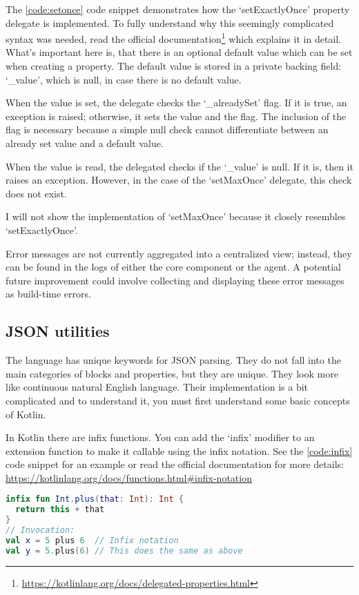 The \ref{code:setonce} code snippet demonstrates how the `setExactlyOnce' property delegate is implemented. To fully understand why this seemingly complicated syntax was needed, read the official documentation\footnote{\url{https://kotlinlang.org/docs/delegated-properties.html}} which explains it in detail. What's important here is, that there is an optional default value which can be set when creating a property. The default value is stored in a private backing field: `\_value', which is null, in case there is no default value. 

When the value is set, the delegate checks the `\_alreadySet' flag. If it is true, an exception is raised; otherwise, it sets the value and the flag. The inclusion of the flag is necessary because a simple null check cannot differentiate between an already set value and a default value.

When the value is read, the delegated checks if the `\_value' is null. If it is, then it raises an exception. However, in the case of the `setMaxOnce' delegate, this check does not exist.

I will not show the implementation of `setMaxOnce' because it closely resembles `setExactlyOnce'.

Error messages are not currently aggregated into a centralized view; instead, they can be found in the logs of either the core component or the agent. A potential future improvement could involve collecting and displaying these error messages as build-time errors.

\subsection{JSON utilities}

The language has unique keywords for JSON parsing. They do not fall into the main categories of blocks and properties, but they are unique. They look more like continuous natural English language. Their implementation is a bit complicated and to understand it, you must first understand some basic concepts of Kotlin.

In Kotlin there are infix functions. You can add the `infix' modifier to an extension function to make it callable using the infix notation. See the \ref{code:infix} code snippet for an example or read the official documentation for more details: \url{https://kotlinlang.org/docs/functions.html#infix-notation}

\begin{minipage}{\linewidth}
\begin{lstlisting}[caption={Infix functions},language=Kotlin,label=code:infix]
infix fun Int.plus(that: Int): Int {
  return this + that
}
// Invocation:
val x = 5 plus 6  // Infix notation
val y = 5.plus(6) // This does the same as above
\end{lstlisting}
\end{minipage}

